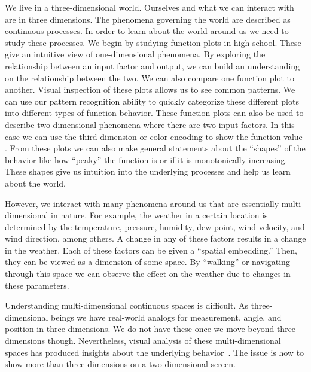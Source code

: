 
We live in a three-dimensional world. 
Ourselves and what we can interact with are in three dimensions.
The phenomena governing the world are described as continuous processes.
In order to learn about the world around us we need to study these processes.
We begin by studying function plots in high 
school. These give an intuitive view of one-dimensional 
phenomena. 
By exploring the relationship
between an input factor
and output,
we can build an understanding on the relationship between the two.
We can also compare one function plot to another. Visual inspection of these plots
allows us to see common patterns. We can use our pattern recognition ability
to quickly categorize these different plots into different types of function
behavior. These function plots can also be used to describe two-dimensional
phenomena where there are two input factors. In this case we can use the third
dimension or color encoding to show the function value . 
From these plots we can also make general statements about the ``shapes'' of
the behavior like how ``peaky'' the function is or if it is monotonically
increasing. These shapes give us intuition into the underlying processes and
help us learn about the world.

However, we interact with many phenomena around us that are essentially
multi-dimensional in nature. For example, the weather in a certain location is
determined by the temperature, pressure, humidity, dew point, wind velocity,
and wind direction, among others. A change in any of these factors results in a
change in the weather. Each of these factors can be given a ``spatial
embedding.'' Then, they can be viewed as a dimension of some space.  By
``walking'' or navigating through this space we can observe the effect on the
weather due to changes in these parameters. 

Understanding multi-dimensional continuous spaces is difficult. As
three-dimensional beings we have real-world analogs for measurement,
angle, and position in three dimensions. We do not have these once we
move beyond three dimensions though. Nevertheless, visual analysis of
these multi-dimensional spaces has produced insights about the
underlying behavior~\cite{Sedlmair:2014}. The issue is how to show more
than three dimensions on a two-dimensional screen. 

